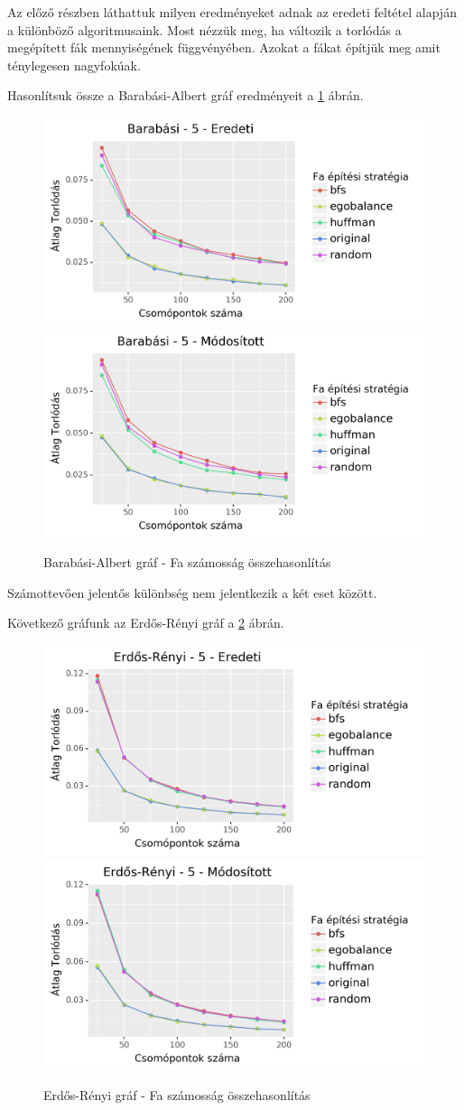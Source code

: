 \documentclass[12pt]{report}
\begin{document}
Az előző részben láthattuk milyen eredményeket adnak az eredeti feltétel alapján a különböző algoritmusaink.
Most nézzük meg, ha változik a torlódás a megépített fák mennyiségének függvényében. 
Azokat a fákat építjük meg amit ténylegesen nagyfokúak.

Hasonlítsuk össze a Barabási-Albert gráf eredményeit a \ref{barabasi-tree-difference-con} ábrán.

\begin{figure}[H]
	\begin{center}
		\includegraphics[width=0.49\linewidth]{pictures/barabasi_con_e.png}
		\includegraphics[width=0.49\linewidth]{pictures/barabasi_con_m.png}
		\caption{Barabási-Albert gráf - Fa számosság összehasonlítás}
		\label{barabasi-tree-difference-con}
	\end{center}
\end{figure}

Számottevően jelentős különbség nem jelentkezik a két eset között.

Következő gráfunk az Erdős-Rényi gráf a \ref{erdos-tree-difference-con} ábrán.

\begin{figure}[H]
	\begin{center}
		\includegraphics[width=0.49\linewidth]{pictures/erdos_con_e.png}
		\includegraphics[width=0.49\linewidth]{pictures/erdos_con_m.png}
		\caption{Erdős-Rényi gráf - Fa számosság összehasonlítás}
		\label{erdos-tree-difference-con}
	\end{center}
\end{figure}
\end{document}

